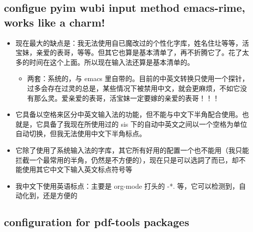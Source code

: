 \documentclass[9pt, b5paper]{article}
\begin{document}
\subsection{configue pyim wubi input method emacs-rime, works like a charm!}
\label{sec:orgb4d7218}
\begin{itemize}
\item 现在最大的缺点是：我无法使用自已魔改过的个性化字库，姓名住圵等等，活宝妹，亲爱的表哥，等等。但其它也算是基本清单了，再不折腾它了。花了太多的时间在这个上面。所以现在输入法还算是基本清单的。
\begin{itemize}
\item 两套：系统的，与 emacs 里自带的。目前的中英文转换只使用一个探针，过多会存在过灵的总是，某些情况下被禁用中文，就会更麻烦，不如它没有那么灵。爱亲爱的表哥，活宝妹一定要嫁的亲爱的表哥！！！
\end{itemize}
\item 它具备以空格来区分中英文输入法的功能，但不能与中文下半角配合使用。也就是，它具备了我现在所使用过的 sis 下的自动中英文之间以一个空格为单位自动切换，但我无法使用中文下半角标点。
\item 它除了使用了系统输入法的字库，其它所有好用的配置一个也不能用（我只能拦截一个最常用的半角，仍然是不方便的），现在只是可以选詞了而已，却不能使用其它中文下输入英文标点符号等
\item 我中文下使用英语标点：主要是 org-mode 打头的 -*. 等，它可以检测到，自动化到，还是方便的
\end{itemize}
\subsection{configuration for pdf-tools packages}
\label{sec:org0bdfc3b}
\end{document}
